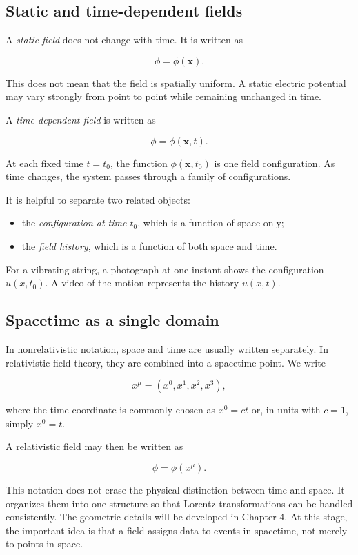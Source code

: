 \subsection{Static and time-dependent fields}

A \emph{static field} does not change with time. It is written as

\[
\phi=\phi(\mathbf{x}).
\]

This does not mean that the field is spatially uniform. A static electric potential may vary strongly from point to point while remaining unchanged in time.

A \emph{time-dependent field} is written as

\[
\phi=\phi(\mathbf{x},t).
\]

At each fixed time \(t=t_{0}\), the function \(\phi(\mathbf{x},t_{0})\) is one field configuration. As time changes, the system passes through a family of configurations.

It is helpful to separate two related objects:

\begin{itemize}
    \item the \emph{configuration at time \(t_{0}\)}, which is a function of space only;
    \item the \emph{field history}, which is a function of both space and time.
\end{itemize}

For a vibrating string, a photograph at one instant shows the configuration \(u(x,t_{0})\). A video of the motion represents the history \(u(x,t)\).

\subsection{Spacetime as a single domain}

In nonrelativistic notation, space and time are usually written separately. In relativistic field theory, they are combined into a spacetime point. We write

\[
x^{\mu}=(x^{0},x^{1},x^{2},x^{3}),
\]

where the time coordinate is commonly chosen as \(x^{0}=ct\) or, in units with \(c=1\), simply \(x^{0}=t\).

A relativistic field may then be written as

\[
\phi=\phi(x^{\mu}).
\]

This notation does not erase the physical distinction between time and space. It organizes them into one structure so that Lorentz transformations can be handled consistently. The geometric details will be developed in Chapter 4. At this stage, the important idea is that a field assigns data to events in spacetime, not merely to points in space.

